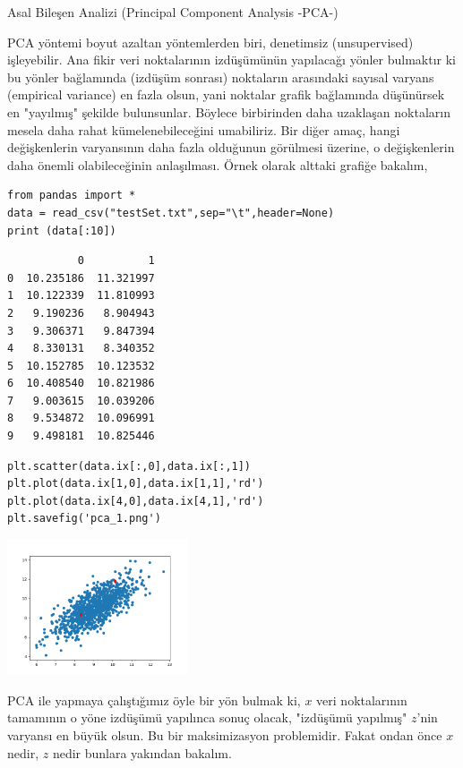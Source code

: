 \documentclass[12pt,fleqn]{article}\usepackage{../../common}
\begin{document}
Asal Bileşen Analizi (Principal Component Analysis -PCA-)

PCA yöntemi boyut azaltan yöntemlerden biri, denetimsiz (unsupervised)
işleyebilir. Ana fikir veri noktalarının izdüşümünün yapılacağı yönler
bulmaktır ki bu yönler bağlamında (izdüşüm sonrası) noktaların arasındaki
sayısal varyans (empirical variance) en fazla olsun, yani noktalar grafik
bağlamında düşünürsek en "yayılmış" şekilde bulunsunlar. Böylece
birbirinden daha uzaklaşan noktaların mesela daha rahat kümelenebileceğini
umabiliriz.  Bir diğer amaç, hangi değişkenlerin varyansının daha fazla
olduğunun görülmesi üzerine, o değişkenlerin daha önemli olabileceğinin
anlaşılması. Örnek olarak alttaki grafiğe bakalım,

\begin{verbatim}
from pandas import *
data = read_csv("testSet.txt",sep="\t",header=None)
print (data[:10])
\end{verbatim}

\begin{verbatim}
           0          1
0  10.235186  11.321997
1  10.122339  11.810993
2   9.190236   8.904943
3   9.306371   9.847394
4   8.330131   8.340352
5  10.152785  10.123532
6  10.408540  10.821986
7   9.003615  10.039206
8   9.534872  10.096991
9   9.498181  10.825446
\end{verbatim}

\begin{verbatim}
plt.scatter(data.ix[:,0],data.ix[:,1])
plt.plot(data.ix[1,0],data.ix[1,1],'rd')
plt.plot(data.ix[4,0],data.ix[4,1],'rd')
plt.savefig('pca_1.png')
\end{verbatim}

\includegraphics[height=4cm]{pca_1.png}

PCA ile yapmaya çalıştığımız öyle bir yön bulmak ki, $x$ veri
noktalarının tamamının o yöne izdüşümü yapılınca sonuç olacak,
"izdüşümü yapılmış" $z$'nin varyansı en büyük olsun. Bu bir
maksimizasyon problemidir. Fakat ondan önce $x$ nedir, $z$ nedir
bunlara yakından bakalım.
\end{document}
